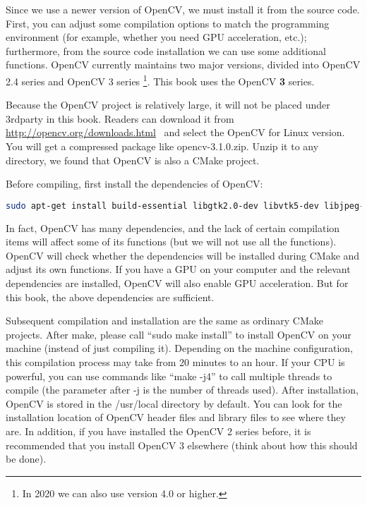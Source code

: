 Since we use a newer version of OpenCV, we must install it from the source code. First, you can adjust some compilation options to match the programming environment (for example, whether you need GPU acceleration, etc.); furthermore, from the source code installation we can use some additional functions. OpenCV currently maintains two major versions, divided into OpenCV 2.4 series and OpenCV 3 series \footnote{In 2020 we can also use version 4.0 or higher.}. This book uses the OpenCV \textbf {3} series.

Because the OpenCV project is relatively large, it will not be placed under 3rdparty in this book. Readers can download it from ~ \url{http://opencv.org/downloads.html}~ and select the OpenCV for Linux version. You will get a compressed package like opencv-3.1.0.zip. Unzip it to any directory, we found that OpenCV is also a CMake project.

Before compiling, first install the dependencies of OpenCV:
\begin{lstlisting}[language=sh, caption=Terminal input:]
sudo apt-get install build-essential libgtk2.0-dev libvtk5-dev libjpeg-dev libtiff4-dev libjasper-dev libopenexr-dev libtbb-dev
\end{lstlisting}

In fact, OpenCV has many dependencies, and the lack of certain compilation items will affect some of its functions (but we will not use all the functions). OpenCV will check whether the dependencies will be installed during CMake and adjust its own functions. If you have a GPU on your computer and the relevant dependencies are installed, OpenCV will also enable GPU acceleration. But for this book, the above dependencies are sufficient.

Subsequent compilation and installation are the same as ordinary CMake projects. After make, please call ``sudo make install'' to install OpenCV on your machine (instead of just compiling it). Depending on the machine configuration, this compilation process may take from 20 minutes to an hour. If your CPU is powerful, you can use commands like ``make -j4'' to call multiple threads to compile (the parameter after -j is the number of threads used). After installation, OpenCV is stored in the /usr/local directory by default. You can look for the installation location of OpenCV header files and library files to see where they are. In addition, if you have installed the OpenCV 2 series before, it is recommended that you install OpenCV 3 elsewhere (think about how this should be done).

